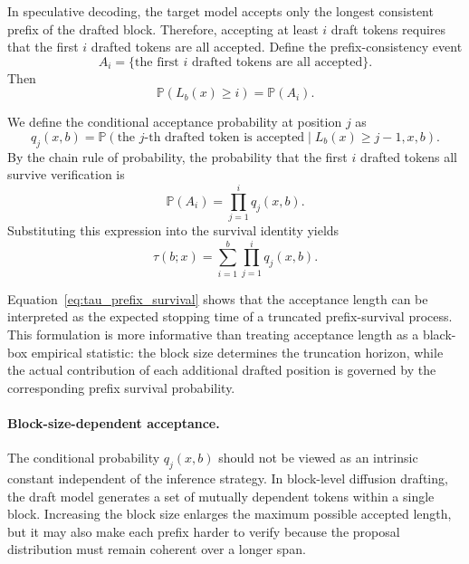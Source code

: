 \documentclass{article}
\begin{document}
In speculative decoding, the target model accepts only the longest consistent prefix of the drafted block. Therefore, accepting at least $i$ draft tokens requires that the first $i$ drafted tokens are all accepted. Define the prefix-consistency event
\begin{equation}
A_i
=
\{\text{the first $i$ drafted tokens are all accepted}\}.
\end{equation}
Then
\begin{equation}
\mathbb{P}(L_b(x)\ge i)
=
\mathbb{P}(A_i).
\end{equation}

We define the conditional acceptance probability at position $j$ as
\begin{equation}
q_j(x,b)
=
\mathbb{P}
\left(
\text{the $j$-th drafted token is accepted}
\mid
L_b(x)\ge j-1, x, b
\right).
\end{equation}
By the chain rule of probability, the probability that the first $i$ drafted tokens all survive verification is
\begin{equation}
\mathbb{P}(A_i)
=
\prod_{j=1}^{i}
q_j(x,b).
\end{equation}
Substituting this expression into the survival identity yields
\begin{equation}
\label{eq:tau_prefix_survival}
\tau(b;x)
=
\sum_{i=1}^{b}
\prod_{j=1}^{i}
q_j(x,b).
\end{equation}

Equation~\eqref{eq:tau_prefix_survival} shows that the acceptance length can be interpreted as the expected stopping time of a truncated prefix-survival process. This formulation is more informative than treating acceptance length as a black-box empirical statistic: the block size determines the truncation horizon, while the actual contribution of each additional drafted position is governed by the corresponding prefix survival probability.

\paragraph{Block-size-dependent acceptance.}
The conditional probability $q_j(x,b)$ should not be viewed as an intrinsic constant independent of the inference strategy. In block-level diffusion drafting, the draft model generates a set of mutually dependent tokens within a single block. Increasing the block size enlarges the maximum possible accepted length, but it may also make each prefix harder to verify because the proposal distribution must remain coherent over a longer span.
\end{document}
